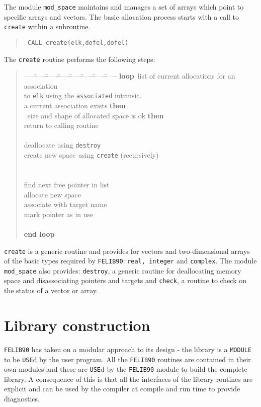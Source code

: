 \documentclass[a4paper,titlepage,11pt]{article}
\begin{document}
The module {\tt mod\_space} maintains and manages a set of arrays which point to 
specific arrays and vectors. The basic allocation process starts with a call to 
{\tt create} within a subroutine.
\begin{quote}
\source
\tt
CALL create(elk,dofel,dofel)
\end{quote}
The {\tt create} routine performs the following steps:
\begin{quote}
\it
\begin{tabbing}
-----\=-----\=-----\=-----\=-----\=-----\=-----\=-----\kill
{\bf loop}~list of current allocations for an association\\ 
\>to {\tt elk} using the {\tt associated} intrinsic. \\
 a current association exists {\bf then}\\
\>~size and shape of allocated space is ok {\bf then}\\
\>\>\> return to calling routine\\
\>\\
\>\>\> deallocate using {\tt destroy}\\
\>\>\> create new space using {\tt create} (recursively)\\
\>\\ 
\\
\>\>find next free pointer in list\\
\>\>allocate new space\\
\>\>associate with target name\\
\>\>mark pointer as in use\\
\\
{\bf end loop}
\end{tabbing}
\end{quote}
{\tt create} is a generic routine and provides for vectors and two-dimensional 
arrays of the basic types required by {\tt FELIB90}: {\tt real, integer} and  {\tt complex}.
The module {\tt mod\_space} also provides: {\tt destroy}, a generic routine for
deallocating memory space and disassociating pointers and targets and {\tt check},
a routine to check on the status of a vector or array.
%
\section{Library construction}
{\tt FELIB90} has taken on a modular approach to its design - the library is
a {\tt MODULE} to be {\tt USE}d by the user program. All the {\tt FELIB90}
routines are contained in their own modules and these are {\tt USE}d
by the {\tt FELIB90} module to build the complete library. A consequence of
this is that all the interfaces of the library routines are explicit and
can be used by the compiler at compile and run time to provide diagnostics.
\end{document}
